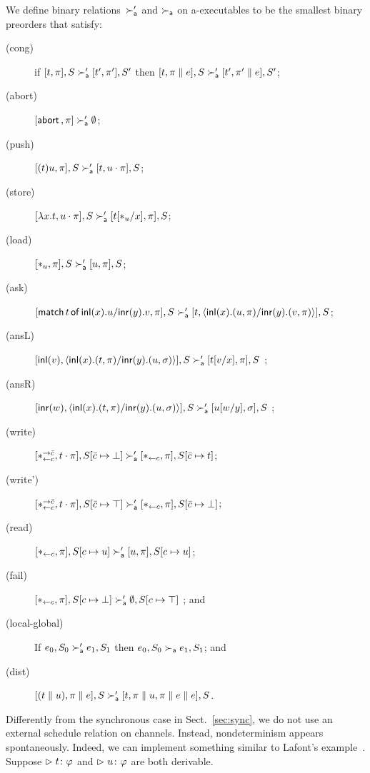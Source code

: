 \documentclass[envcountsame]{llncs}
\begin{document}
We define binary relations~$\succ_{\mathsf a}'$ and $\succ_{\mathsf a}$ on a-executables to be the smallest binary preorders
that satisfy:
\begin{description}
 \item[(cong)] if
	    $[t,\pi],         S \succ_{\mathsf a}' [ t',\pi'],        S'$
	    then
	    $[t,\pi \parallel e], S \succ_{\mathsf a}' [ t',\pi'\parallel e], S'$\enspace;
 \item[(abort)] $[\mathsf{abort\,},\pi] \succ_{\mathsf a}' \emptyset$\enspace;
 \item[(push)]
	    $[(t)u,\pi],S       \succ_{\mathsf a}' [t,u\cdot\pi],S$;
 \item[(store)]
	    $[\lambda x.t,u\cdot\pi],S
	     \succ_{\mathsf a}'
	     [t[\ast_u/x],      \pi],S$\enspace;
 \item[(load)]
	    $[\ast_u,\pi],S\succ_{\mathsf a}'[u,\pi],S$\enspace;
 \item[(ask)]
      $[\mathsf{match}\,{t}\,\mathsf{of}\, \mathsf{inl}({x}). {u}/ \mathsf{inr}({y}). {v},\pi], S\succ_{\mathsf a}' [t,\langle \mathsf{inl}({x}). ({u},{\pi})/ \mathsf{inr}({y}). ({v},{\pi})\rangle], S$\enspace;
 \item[(ansL)]
      $[\mathsf{inl}({v}), \langle \mathsf{inl}({x}). ({t},{\pi})/ \mathsf{inr}({y}). ({u},{\sigma})\rangle],S \succ_{\mathsf a}' [t[v/x],\pi],S $ \enspace;
 \item[(ansR)]
      $[\mathsf{inr}({w}), \langle \mathsf{inl}({x}). ({t},{\pi})/ \mathsf{inr}({y}). ({u},{\sigma})\rangle],S \succ_{\mathsf a}' [u[w/y],\sigma],S $ \enspace;
 \item[(write)]
	    $
	    [\ast^{\rightarrow {\bar{c}}}_{\leftarrow{c}}, t\cdot\pi], S[\bar{c}\mapsto\bot]
	    \succ_{\mathsf a}'
	    [\ast_{\leftarrow{c}}, \pi],
	    S[\bar{c}\mapsto t]
	    $\enspace;
 \item[(write')]
	    $
	    [\ast^{\rightarrow {\bar{c}}}_{\leftarrow{c}}, t\cdot\pi], S[\bar{c}\mapsto \top]
	    \succ_{\mathsf a}'
	    [\ast_{\leftarrow{c}}, \pi],
	    S[\bar{c}\mapsto \bot]
	    $\enspace;
 \item[(read)]$
	    [\ast_{\leftarrow{c}} ,\pi],
	    S[c\mapsto u]
	    \succ_{\mathsf a}'
	    [u,\pi],
	    S[c\mapsto u]
	    $\enspace;
 \item[(fail)]
	    $
	    [\ast_{\leftarrow{c}},\pi],
	    S[c\mapsto \bot]
	    \succ_{\mathsf a}'
	    \emptyset,S[c\mapsto \top]
	    $
	    \enspace; and
 \item[(local-global)] If $e_0, S_0\succ_{\mathsf a}'e_1, S_1$ then $e_0, S_0\succ_{\mathsf a} e_1,
      S_1$\enspace; and
 \item[(dist)]
	    $[(t\parallel u),\pi\parallel e],S   \succ_{\mathsf a}' [t,\pi\parallel u,\pi\parallel
      e\parallel e],S$\enspace.
\end{description}
Differently from the synchronous case in Sect.~\ref{sec:sync},
we do not use an external schedule relation on channels.
Instead, nondeterminism appears spontaneously.
Indeed, we can implement something similar to Lafont's
example~\citep[B.1]{girard1989proofs}.
Suppose $\vartriangleright{t} \colon{\varphi}$ and $\vartriangleright{u} \colon{\varphi}$ are both derivable.
\end{document}
